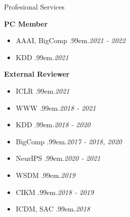 \documentclass{resume} %
\makeatletter
\newcommand \Dotfill {\leavevmode \cleaders \hb@xt@ .99em{\hss .\hss }\hfill \kern \z@}
\makeatother
\begin{document}
\begin{rSection}{Profesional Services}


\textbf{PC Member}
\begin{itemize}[noitemsep]
	\item AAAI, BigComp \smallskip \Dotfill \emph{2021 - 2022}
	\item KDD \smallskip \Dotfill \emph{2021}
\end{itemize}

\textbf{External Reviewer}
\begin{itemize}[noitemsep]
	\item ICLR \smallskip \Dotfill \emph{2021} \\
	\item WWW \smallskip \Dotfill \emph{2018 - 2021} \\
	\item KDD \smallskip \Dotfill \emph{2018 - 2020} \\
	\item BigComp \smallskip \Dotfill \emph{2017 - 2018, 2020} \\
	\item NeurIPS \smallskip \Dotfill \emph{2020 - 2021} \\
	\item WSDM \smallskip \Dotfill \emph{2019} \\
	\item CIKM \smallskip \Dotfill \emph{2018 - 2019} \\
	\item ICDM, SAC \smallskip \Dotfill \emph{2018} \\
\end{itemize}

\end{rSection}


\begin{comment}
\begin{rSection}{Experience}

\textbf{Infosys Limited} \hfill Bengaluru, India \\ 
\emph{Student Intern} \hfill \emph{Jun. 2015 - Jul. 2015}

\textbf{SK Hynix} \hfill Incheon, South Korea \\ 
\emph{Student Intern} \hfill \emph{Dec. 2014 - Jan. 2015}

\textbf{KISTI} \hfill Daejeon, South Korea \\ 
\emph{Student Intern} \hfill \emph{Jan. 2014 - Feb. 2014}

\end{rSection}
\end{comment}
\end{document}
